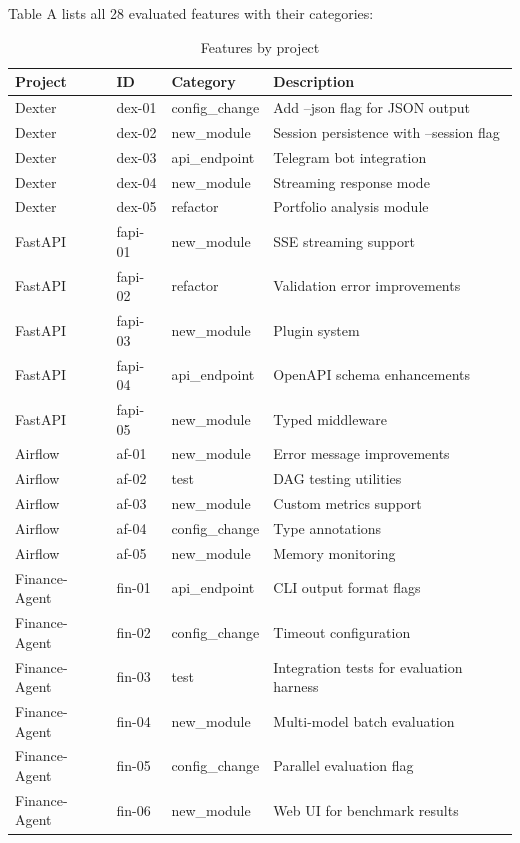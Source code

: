 \documentclass[sigconf,anonymous,review]{acmart}
\begin{document}
Table A lists all 28 evaluated features with their categories:

\begin{table}[ht]
  \centering
  \caption{Features by project}
  \label{tab:feature-list}
  \begin{tabular}{lllp{4.5cm}}
    \hline
    \textbf{Project} & \textbf{ID} & \textbf{Category} & \textbf{Description} \\
    \hline
    Dexter & dex-01 & config\_change & Add --json flag for JSON output \\
    Dexter & dex-02 & new\_module & Session persistence with --session flag \\
    Dexter & dex-03 & api\_endpoint & Telegram bot integration \\
    Dexter & dex-04 & new\_module & Streaming response mode \\
    Dexter & dex-05 & refactor & Portfolio analysis module \\
    FastAPI & fapi-01 & new\_module & SSE streaming support \\
    FastAPI & fapi-02 & refactor & Validation error improvements \\
    FastAPI & fapi-03 & new\_module & Plugin system \\
    FastAPI & fapi-04 & api\_endpoint & OpenAPI schema enhancements \\
    FastAPI & fapi-05 & new\_module & Typed middleware \\
    Airflow & af-01 & new\_module & Error message improvements \\
    Airflow & af-02 & test & DAG testing utilities \\
    Airflow & af-03 & new\_module & Custom metrics support \\
    Airflow & af-04 & config\_change & Type annotations \\
    Airflow & af-05 & new\_module & Memory monitoring \\
    Finance-Agent & fin-01 & api\_endpoint & CLI output format flags \\
    Finance-Agent & fin-02 & config\_change & Timeout configuration \\
    Finance-Agent & fin-03 & test & Integration tests for evaluation harness \\
    Finance-Agent & fin-04 & new\_module & Multi-model batch evaluation \\
    Finance-Agent & fin-05 & config\_change & Parallel evaluation flag \\
    Finance-Agent & fin-06 & new\_module & Web UI for benchmark results \\

\end{tabular}
\end{table}
\end{document}
